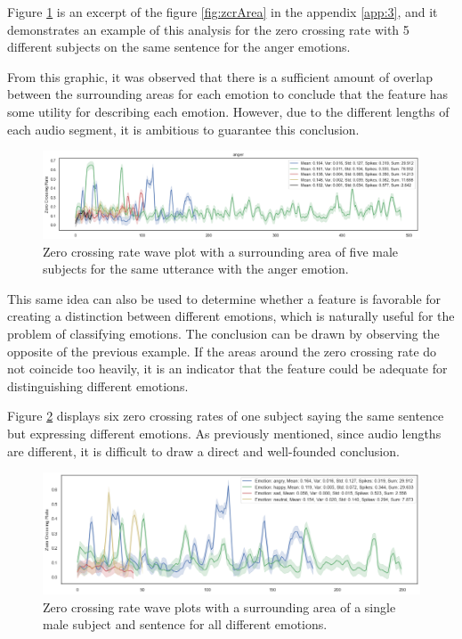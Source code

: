 Figure \ref{fig:zcrAreaOnly1} is an excerpt of the figure \ref{fig:zcrArea} in the appendix \ref{app:3}, and it demonstrates an example of this analysis for the zero crossing rate with 5 different subjects on the same sentence for the anger emotions.

From this graphic, it was observed that there is a sufficient amount of overlap between the surrounding areas for each emotion to conclude that the feature has some utility for describing each emotion. However, due to the different lengths of each audio segment, it is ambitious to guarantee this conclusion.

\begin{figure}[H]
	\centering
	\includegraphics[width=1\linewidth]{figs/4_1_traditional/zcrAreaOnly1.png}
	\caption{Zero crossing rate wave plot with a surrounding area of five male subjects for the same utterance with the anger emotion.}
	\label{fig:zcrAreaOnly1}
\end{figure}

This same idea can also be used to determine whether a feature is favorable for creating a distinction between different emotions, which is naturally useful for the problem of classifying emotions. The conclusion can be drawn by observing the opposite of the previous example. If the areas around the zero crossing rate do not coincide too heavily, it is an indicator that the feature could be adequate for distinguishing different emotions.

Figure \ref{fig:zcrAreaSameSubj} displays six zero crossing rates of one subject saying the same sentence but expressing different emotions. As previously mentioned, since audio lengths are different, it is difficult to draw a direct and well-founded conclusion.

\begin{figure}[H]
	\centering
	\includegraphics[width=.8\linewidth]{figs/4_1_traditional/zcr_male_same_subject.png}
	\caption{Zero crossing rate wave plots with a surrounding area of a single male subject and sentence for all different emotions.}
	\label{fig:zcrAreaSameSubj}
\end{figure}

